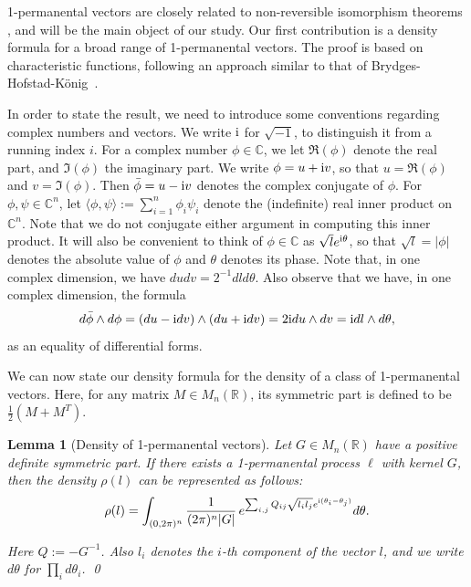 \documentclass[a4paper, 11pt]{article}
\newcommand{\compi}{\textnormal{i}}
\newtheorem{lem}[thm]{Lemma}
\begin{document}
1-permanental vectors are closely related to non-reversible isomorphism theorems \cite{lejan08, ek09}, and
will be the main object of our study.
Our first
contribution is a density formula for a broad range of 1-permanental vectors.
The proof is based on characteristic functions, following an approach similar to that of Brydges-Hofstad-König~\cite{bhk07}.

In order to state the result, we need to introduce some conventions regarding complex numbers and vectors. We write $\compi$ for $\sqrt{-1}$, to distinguish it from a running index $i$. For a complex number $\phi\in\mathbb{C}$, we let $\Re(\phi)$
denote the real part, and $\Im(\phi)$
the imaginary part. We write $\phi =u +\compi v$, so that $u = \Re(\phi)$ and $v = \Im(\phi)$. Then $\bar{\phi} = u - \compi v$ denotes the complex conjugate of $\phi$. For $\phi, \psi \in \mathbb{C}^n$, let $\langle \phi, \psi \rangle := \sum_{i=1}^n \phi_i \psi_i$ denote the (indefinite) real inner product on $\mathbb{C}^n$. Note that we do not conjugate either argument in computing this inner product. It will also be convenient to think of $\phi \in \mathbb{C}$ as $\sqrt{l} e^{\compi \theta}$, so that $\sqrt{l} =|\phi|$ denotes the absolute value of $\phi$ and $\theta$ denotes its phase. Note that, in one complex dimension, we have $du dv = 2^{-1} dl d\theta$. Also observe that we have, in one complex dimension, the formula
\begin{equation}        \label{eq:diffform}
d \bar{\phi} \wedge d \phi = (du - \compi dv) \wedge (du + \compi dv) = 2 \compi du \wedge dv = \compi dl \wedge d\theta,
\end{equation}
as an equality of differential forms.

We can now state our density formula for the density of a class of 1-permanental vectors. Here, for any matrix $M\in M_n(\mathbb{R})$, its symmetric part is defined to be $\frac{1}{2}(M + M^T)$.

\vspace{.3em} \begin{lem}[Density of 1-permanental vectors]   \label{lem:density}
Let $G\in M_n(\mathbb{R})$ have a positive definite symmetric part.
If there exists a 1-permanental process $\ell$ with kernel $G$, then the density $\rho(l)$ can be represented as follows:
\begin{equation}
\rho(l) = \int_{(0,2\pi)^n}\frac{1}{(2\pi)^n|G|}\, e^{\sum_{i,j} Q_{ij}\sqrt{l_i l_j}e^{\compi (\theta_i-\theta_j)}}d\theta.
\label{eqn:densityformula}
\end{equation}

Here $Q :=-G^{-1}$. Also $l_i$ denotes the $i$-th component of the vector
$l$, and we write $d\theta$ for $\prod_i d \theta_i$.
\qed
\end{lem}
\end{document}
